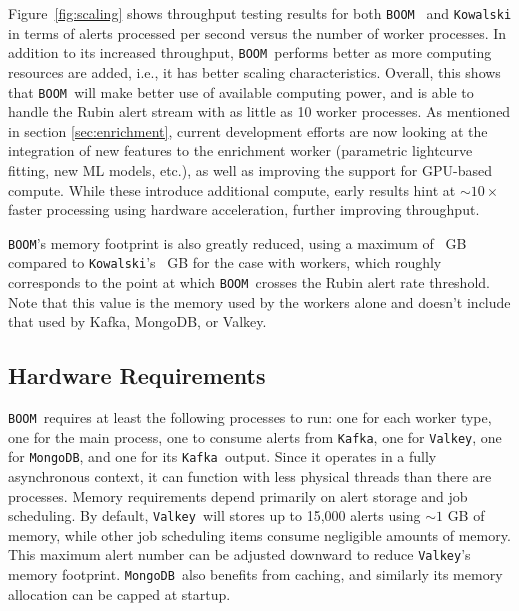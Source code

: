 \documentclass[twocolumn]{aastex631}
\newcommand{\boom}{\texttt{BOOM }}
\newcommand{\kowalski}{\texttt{Kowalski }}
\newcommand{\kafka}{\texttt{Kafka }}
\newcommand{\valkey}{\texttt{Valkey }}
\newcommand{\mongo}{\texttt{MongoDB }}
\begin{document}
Figure~\ref{fig:scaling} shows throughput testing results for both \boom
and \kowalski in terms of alerts processed per second
versus the number of worker processes.
In addition to its increased throughput, \boom performs better as more
computing resources are added, i.e., it has better scaling characteristics.
Overall, this shows that \boom will make better use of
available computing power,
and is able to handle the Rubin alert stream with as little as 10
worker processes.
As mentioned in section \ref{sec:enrichment}, current development efforts
are now looking at the integration of new features to the enrichment worker
(parametric lightcurve fitting, new ML models, etc.), as well as improving
the support for GPU-based compute. While these introduce additional compute,
early results hint at $\sim 10 \times$ faster processing using hardware
acceleration, further improving throughput.

\texttt{BOOM}'s memory footprint is also greatly reduced,
using a maximum of \boommaxmem~GB compared to \texttt{Kowalski}'s \kowalskimaxmem~GB
for the case with  \space workers,
which roughly corresponds to the point at which \boom crosses the Rubin
alert rate threshold.
Note that this value is the memory used by the workers alone
and doesn't include that used by Kafka, MongoDB, or Valkey.

\subsection{Hardware Requirements}

\boom requires at least the following processes to run: one for each worker type, one for the main process, one to consume alerts from \texttt{Kafka}, one for \texttt{Valkey}, one for \texttt{MongoDB}, and one for its \kafka output. Since it operates in a fully asynchronous context, it can function with less physical threads than there are processes.
Memory requirements depend primarily on alert storage and job scheduling. By default, \valkey will stores up to 15,000 alerts using $\sim 1$ GB of memory, while other job scheduling items consume negligible amounts of memory. This maximum alert number can be adjusted downward to reduce \texttt{Valkey}'s memory footprint. \mongo also benefits from caching, and similarly its memory allocation can be capped at startup.
\end{document}
